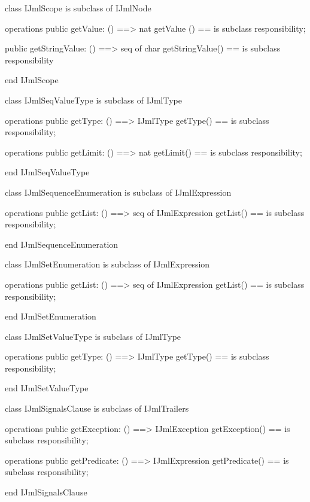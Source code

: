 \begin{vdm_al}
class IJmlScope
 is subclass of IJmlNode

operations
  public getValue: () ==> nat
  getValue () == is subclass responsibility;

  public getStringValue: () ==> seq of char
  getStringValue() == is subclass responsibility

end IJmlScope
\end{vdm_al}

\begin{vdm_al}
class IJmlSeqValueType
 is subclass of IJmlType

operations
  public getType: () ==> IJmlType
  getType() == is subclass responsibility;

operations
  public getLimit: () ==> nat
  getLimit() == is subclass responsibility;

end IJmlSeqValueType
\end{vdm_al}

\begin{vdm_al}
class IJmlSequenceEnumeration
 is subclass of IJmlExpression

operations
  public getList: () ==> seq of IJmlExpression
  getList() == is subclass responsibility;

end IJmlSequenceEnumeration
\end{vdm_al}

\begin{vdm_al}
class IJmlSetEnumeration
 is subclass of IJmlExpression

operations
  public getList: () ==> seq of IJmlExpression
  getList() == is subclass responsibility;

end IJmlSetEnumeration
\end{vdm_al}

\begin{vdm_al}
class IJmlSetValueType
 is subclass of IJmlType

operations
  public getType: () ==> IJmlType
  getType() == is subclass responsibility;

end IJmlSetValueType
\end{vdm_al}

\begin{vdm_al}
class IJmlSignalsClause
 is subclass of IJmlTrailers

operations
  public getException: () ==> IJmlException
  getException() == is subclass responsibility;

operations
  public getPredicate: () ==> IJmlExpression
  getPredicate() == is subclass responsibility;

end IJmlSignalsClause
\end{vdm_al}

